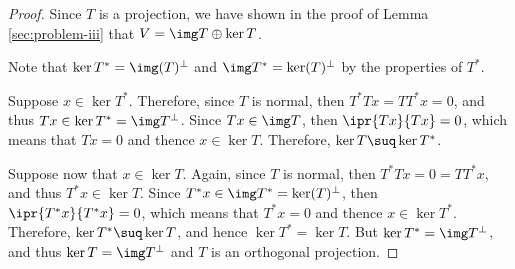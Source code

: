 \documentclass[11pt]{scrartcl}
\begin{document}
\begin{proof}
  Since $T$ is a projection, we have shown in the proof of Lemma
  \ref{sec:problem-iii} that $V = \img T \oplus \ker T$.
  
  Note that $\ker T^{*} = \img (T)^{\bot}$ and
  $\img T^{*} = \ker(T)^{\bot}$ by the properties of $T^{*}$.

  Suppose $x\in \ker T^{*}$. Therefore, since $T$ is normal, then
  $ T^{*}Tx = TT^{*}x = 0$, and thus
  $Tx\in \ker T^{*} = \img T^{\bot}$. Since $Tx\in\img T$, then
  $\ipr{Tx}{Tx} = 0$, which means that $Tx = 0$ and thence
  $x\in\ker T$. Therefore, $\ker T\suq \ker T^{*}$.

  Suppose now that $x\in\ker T$. Again, since $T$ is normal, then
  $T^{*}Tx = 0 = TT^{*}x$, and thus $T^{*}x\in \ker T$. Since
  $T^{*}x\in\img T^{*} = \ker(T)^{\bot}$, then
  $\ipr{T^{*}x}{T^{*}x} = 0$, which means that $T^{*}x = 0$ and thence
  $x\in\ker T^{*}$. Therefore, $\ker T^{*} \suq \ker T$, and hence
  $\ker T^{*} = \ker T$. But $\ker T^{*} = \img T^{\bot}$, and thus
  $\ker T = \img T^{\bot}$ and $T$ is an orthogonal projection.
\end{proof}
\end{document}

